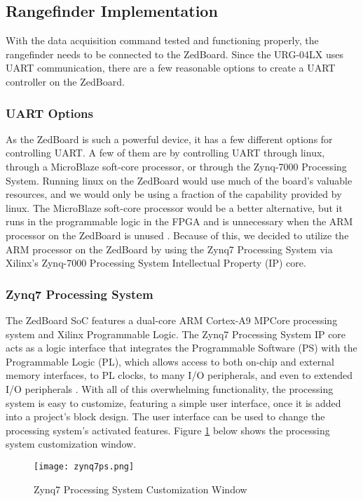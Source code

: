 \subsection{Rangefinder Implementation}
With the data acquisition command tested and functioning properly, the rangefinder needs to be connected to the ZedBoard. Since the URG-04LX uses UART communication, there are a few reasonable options to create a UART controller on the ZedBoard.

\subsubsection{UART Options}
As the ZedBoard is such a powerful device, it has a few different options for controlling UART. A few of them are by controlling UART through linux, through a MicroBlaze soft-core processor, or through the Zynq-7000 Processing System. Running linux on the ZedBoard would use much of the board's valuable resources, and we would only be using a fraction of the capability provided by linux. The MicroBlaze soft-core processor would be a better alternative, but it runs in the programmable logic in the FPGA and is unnecessary when the ARM processor on the ZedBoard is unused \cite{microblaze}. Because of this, we decided to utilize the ARM processor on the ZedBoard by using the Zynq7 Processing System via Xilinx's Zynq-7000 Processing System Intellectual Property (IP) core.

\subsubsection{Zynq7 Processing System}
\label{zynq7processingsystem}
The ZedBoard SoC features a dual-core ARM Cortex-A9 MPCore processing system and Xilinx Programmable Logic. The Zynq7 Processing System IP core acts as a logic interface that integrates the Programmable Software (PS) with the Programmable Logic (PL), which allows access to both on-chip and external memory interfaces, to PL clocks, to many I/O peripherals, and even to extended I/O peripherals \cite{zynq7ps}. With all of this overwhelming functionality, the processing system is easy to customize, featuring a simple user interface, once it is added into a project's block design. The user interface can be used to change the processing system's activated features. Figure \ref{zynq7ps_pic} below shows the processing system customization window.

\begin{figure}[H]
	\centerline{\texttt{[image: zynq7ps.png]}}
	\caption{Zynq7 Processing System Customization Window \cite{zynq7ps}}
	\label{zynq7ps_pic}
\end{figure}

